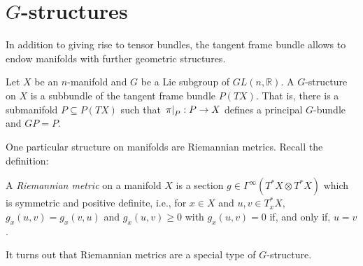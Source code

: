 \documentclass{article}
\begin{document}
\section{$G$-structures}

In addition to giving rise to tensor bundles, the tangent frame bundle
allows to endow manifolds with further geometric structures.

\begin{definition}
  Let $X$ be an $n$-manifold and $G$ be a Lie subgroup of $GL(n,\mathbb{R})$.
  A $G$-structure on $X$ is a subbundle of the tangent frame bundle
  $P(TX)$. That is, there is a submanifold $P\subseteq P(TX)$ such that
  $\left.{\pi}\right\vert_{P}:P\to X$ defines a principal $G$-bundle and $GP=P$.
\end{definition}

One particular structure on manifolds are Riemannian metrics. Recall the
definition:

\begin{definition}
  A \emph{Riemannian metric} on a manifold $X$ is a section
  $g\in\Gamma^\infty(T^*X\otimes T^*X)$ which is symmetric and positive
  definite, i.e., for $x\in X$ and $u,v\in T^*_x X$,
  $g_x(u,v)=g_x(v,u)$ and $g_x(u,v)\geq 0$ with $g_x(u,v)=0$
  if, and only if, $u=v$.
\end{definition}

It turns out that Riemannian metrics are a special type of $G$-structure.
\end{document}

